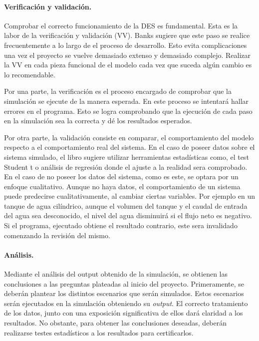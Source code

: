 \paragraph{Verificación y validación.}

Comprobar el correcto funcionamiento de la DES es fundamental.
Esta es la labor de la verificación y validación (VV).
Banks sugiere que este paso se realice
frecuentemente a lo largo de el proceso de desarrollo.
Esto evita complicaciones una vez el proyecto se vuelve demasiado extenso y demasiado complejo.
Realizar la VV en cada pieza funcional de el modelo
cada vez que suceda algún cambio es lo recomendable.

Por una parte, la verificación es el proceso encargado de
comprobar que la simulación se ejecute de la manera esperada.
En este proceso se intentará hallar errores en el programa.
Esto se logra comprobando que la ejecución de cada paso
en la simulación sea la correcta y dé los resultados esperados.

Por otra parte, la validación consiste en comparar,
el comportamiento del modelo respecto a el comportamiento real del sistema.
En el caso de poseer datos sobre el sistema simulado,
el libro sugiere utilizar herramientas estadísticas como, el test Student t o
análisis de regresión donde el ajuste a la realidad sera comprobado.
En el caso de no poseer los datos del sistema, como es este, se optara por un enfoque cualitativo.
Aunque no haya datos, el comportamiento de un sistema
puede predecirse cualitativamente, al cambiar ciertas variables.
Por ejemplo en un tanque de agua cilíndrico,
aunque el volumen del tanque y el caudal de entrada del agua sea desconocido,
el nivel del agua disminuirá si el flujo neto es negativo.
Si el programa, ejecutado obtiene el resultado contrario,
este sera invalidado comenzando la revisión del mismo.

\paragraph{Análisis.}

Mediante el análisis del output obtenido de la simulación,
se obtienen las conclusiones a las preguntas plateadas al inicio del proyecto.
Primeramente, se deberán plantear los distintos escenarios que serán simulados.
Estos escenarios serán ejecutados en la simulación
obteniendo su \textit{output}.
El correcto tratamiento de los datos, junto con una exposición significativa de ellos dará claridad a los resultados.
No obstante, para obtener las conclusiones deseadas, deberán realizarse testes estadísticos a los resultados para certificarlos.

